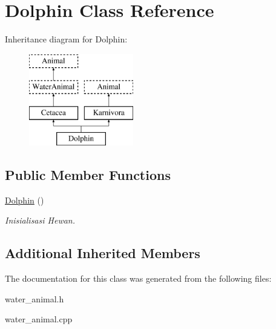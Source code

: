 \hypertarget{class_dolphin}{}\section{Dolphin Class Reference}
\label{class_dolphin}
Inheritance diagram for Dolphin\+:\begin{figure}[H]
\begin{center}
\leavevmode
\includegraphics[height=4.000000cm]{class_dolphin}
\end{center}
\end{figure}
\subsection*{Public Member Functions}
\begin{DoxyCompactItemize}
\item 
\hyperlink{class_dolphin_a571a22b2c3cece5c8175ff49640b35bc}{Dolphin} ()\hypertarget{class_dolphin_a571a22b2c3cece5c8175ff49640b35bc}{}\label{class_dolphin_a571a22b2c3cece5c8175ff49640b35bc}

\begin{DoxyCompactList}\small\item\em Inisialisasi Hewan. \end{DoxyCompactList}\end{DoxyCompactItemize}
\subsection*{Additional Inherited Members}


The documentation for this class was generated from the following files\+:\begin{DoxyCompactItemize}
\item 
water\+\_\+animal.\+h\item 
water\+\_\+animal.\+cpp\end{DoxyCompactItemize}
